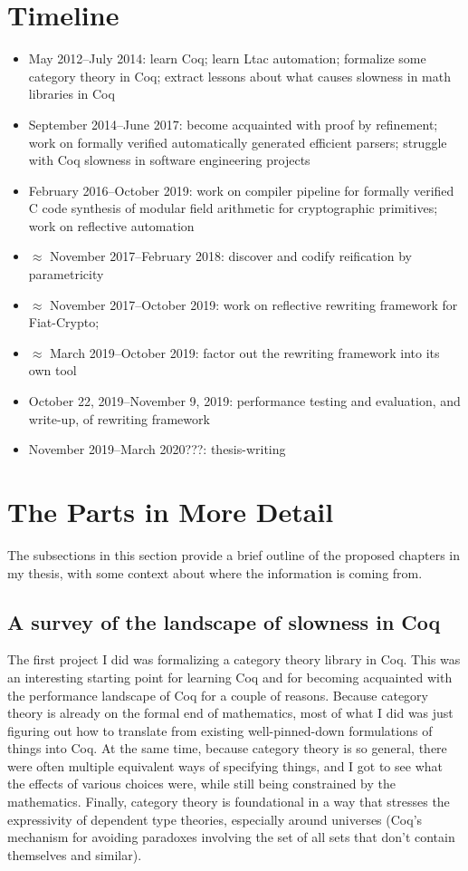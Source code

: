 \documentclass[twoside]{article}
\begin{document}
\section{Timeline}
\begin{itemize}
  \item
    May 2012--July 2014:
    learn Coq;
    learn Ltac automation;
    formalize some category theory in Coq;
    extract lessons about what causes slowness in math libraries in Coq
  \item
    September 2014--June 2017:
    become acquainted with proof by refinement;
    work on formally verified automatically generated efficient parsers;
    struggle with Coq slowness in software engineering projects
  \item
    February 2016--October 2019:
    work on compiler pipeline for formally verified C code synthesis of modular field arithmetic for cryptographic primitives;
    work on reflective automation
  \item
    $\approx$ November 2017--February 2018:
    discover and codify reification by parametricity
  \item
    $\approx$ November 2017--October 2019:
    work on reflective rewriting framework for Fiat-Crypto;
  \item
    $\approx$ March 2019--October 2019:
    factor out the rewriting framework into its own tool
  \item
    October 22, 2019--November 9, 2019:
    performance testing and evaluation, and write-up, of rewriting framework
  \item
    November 2019--March 2020???:
    thesis-writing
\end{itemize}

\section{The Parts in More Detail}

The subsections in this section provide a brief outline of the proposed chapters in my thesis, with some context about where the information is coming from.

\subsection{A survey of the landscape of slowness in Coq}

The first project I did was formalizing a category theory library in Coq.
This was an interesting starting point for learning Coq and for becoming acquainted with the performance landscape of Coq for a couple of reasons.
Because category theory is already on the formal end of mathematics, most of what I did was just figuring out how to translate from existing well-pinned-down formulations of things into Coq.
At the same time, because category theory is so general, there were often multiple equivalent ways of specifying things, and I got to see what the effects of various choices were, while still being constrained by the mathematics.
Finally, category theory is foundational in a way that stresses the expressivity of dependent type theories, especially around universes (Coq's mechanism for avoiding paradoxes involving the set of all sets that don't contain themselves and similar).
\end{document}
